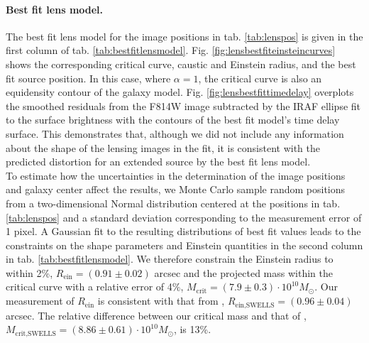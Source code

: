 \paragraph{Best fit lens model.} The best fit lens model for the image positions in tab. \ref{tab:lenspos} is given in the first column of tab. \ref{tab:bestfitlensmodel}. Fig. \ref{fig:lensbestfiteinsteincurves} shows the corresponding critical curve, caustic and Einstein radius, and the best fit source position. In this case, where $\alpha=1$, the critical curve is also an equidensity contour of the galaxy model. Fig. \ref{fig:lensbestfittimedelay} overplots the smoothed residuals from the F814W image subtracted by the IRAF ellipse fit to the surface brightness with the contours of the best fit model's time delay surface. This demonstrates that, although we did not include any information about the shape of the lensing images in the fit, it is consistent with the predicted distortion for an extended source by the best fit lens model.
\\To estimate how the uncertainties in the determination of the image positions and galaxy center affect the results, we Monte Carlo sample random positions from a two-dimensional Normal distribution centered at the positions in tab. \ref{tab:lenspos} and a standard deviation corresponding to the measurement error of 1 pixel. A Gaussian fit to the resulting distributions of best fit values leads to the constraints on the shape parameters and Einstein quantities in the second column in tab. \ref{tab:bestfitlensmodel}. We therefore constrain the Einstein radius to within 2\%, $R_\text{ein} = (0.91 \pm 0.02)$ arcsec and the projected mass within the critical curve with a relative error of 4\%, $M_\text{crit} =(7.9\pm0.3)\cdot 10^{10} M_\odot$. Our measurement of $R_\text{ein}$ is consistent with that from \citet{SWELLSIII}, $R_\text{ein,SWELLS} = (0.96 \pm 0.04)$ arcsec. The relative difference between our critical mass and that of \citet{SWELLSIII}, $M_\text{crit,SWELLS} =(8.86\pm0.61)\cdot 10^{10} M_\odot$, is 13\%.


